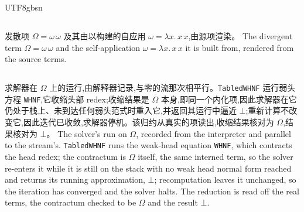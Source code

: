 \begin{CJK*}{UTF8}{gbsn}
  \subsection{}\label{app:omega-code}
  \ifPaperChinese
  发散项 $\Omega = \omega\,\omega$ 及其由以构建的自应用 $\omega = \lambda x.\,x\,x$,由源项渲染。
  \else
  The divergent term $\Omega = \omega\,\omega$ and the self-application $\omega = \lambda x.\,x\,x$ it is built from, rendered from the source terms.
  \fi
  

  \subsection{}\label{app:omega-trace}
  \ifPaperChinese
  求解器在 $\Omega$ 上的运行,由解释器记录,与零的流那次相平行。\texttt{TabledWHNF} 运行弱头方程 \texttt{WHNF},它收缩头部 redex;收缩结果是 $\Omega$ 本身,即同一个内化项,因此求解器在它仍处于栈上、未到达任何弱头范式时重入它,并返回其运行中逼近 $\bot$;重新计算不改变它,因此迭代已收敛,求解器停机。该归约从真实的项读出,收缩结果核对为 $\Omega$,结果核对为 $\bot$。
  \else
  The solver's run on $\Omega$, recorded from the interpreter and parallel to the stream's. \texttt{TabledWHNF} runs the weak-head equation \texttt{WHNF}, which contracts the head redex; the contractum is $\Omega$ itself, the same interned term, so the solver re-enters it while it is still on the stack with no weak head normal form reached and returns its running approximation, $\bot$; recomputation leaves it unchanged, so the iteration has converged and the solver halts. The reduction is read off the real terms, the contractum checked to be $\Omega$ and the result $\bot$.
  \fi
  
  \fi %

  \ifTablambdaBody\else
  \ifTablambdaLNCS\else\fi
  
  \fi

  \ifPaperChinese\clearpage
\end{CJK*}\fi

